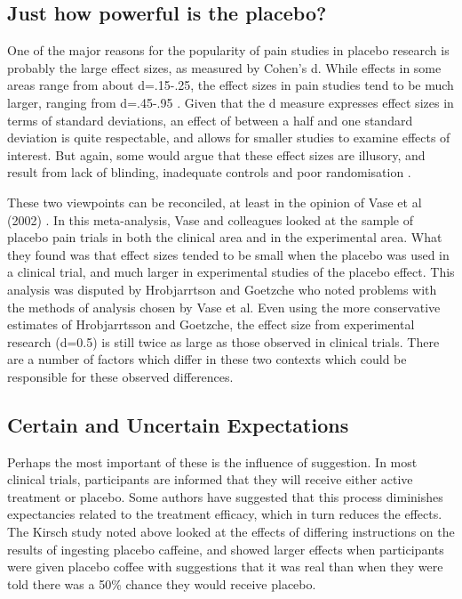 \subsection{Just how powerful is the placebo?}

One of the major reasons for the popularity of pain studies in placebo research is probably the large effect sizes, as measured by Cohen's d. While effects in some areas range from about d=.15-.25, the effect sizes in pain studies tend to be much larger, ranging from d=.45-.95 \cite{Vase2002}. Given that the d measure  expresses effect sizes in terms of standard deviations, an effect of between a half and one standard deviation is quite respectable, and allows for smaller studies to examine effects of interest.  But again, some would argue that these effect sizes are illusory, and result from lack of blinding, inadequate controls and poor randomisation \cite{Hrobjartsson2003,Kienle1997} . 

These two viewpoints can be reconciled, at least in the opinion of Vase et al  (2002) \cite{Vase2002}. In this meta-analysis, Vase and colleagues looked at the sample of placebo pain trials in both the clinical area and in the experimental area. What they found was that effect sizes tended to be small when the placebo was used in a clinical trial, and much larger in experimental studies of the placebo effect. This analysis was disputed by Hrobjarrtson and Goetzche \cite{Hrobjartsson2003} who noted problems with the methods of analysis chosen by Vase et al. Even using the more conservative estimates of Hrobjarrtsson and Goetzche, the effect size from experimental research (d=0.5) is still twice as large as those observed in clinical trials. There are a number of factors which differ in these two contexts which could be responsible for these observed differences. 

\subsection{Certain and Uncertain Expectations}

Perhaps the most important of these is the influence of suggestion. In most clinical trials, participants are informed that they will receive either active treatment or placebo. Some authors have suggested \cite{kirsch1988double} that this process diminishes expectancies related to the treatment efficacy, which in turn reduces the effects. The Kirsch study noted above looked at the effects of differing instructions on the results of ingesting placebo caffeine, and showed larger effects when participants were given placebo coffee with suggestions that it was real than when they were told there was a 50\% chance they would receive placebo. 

